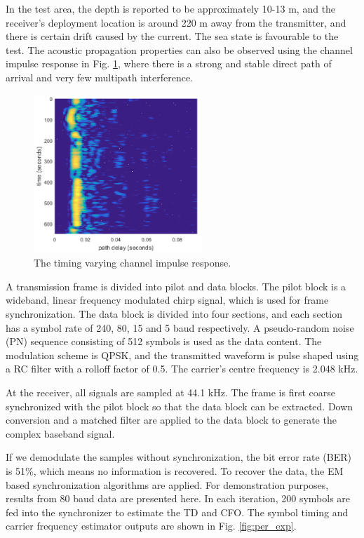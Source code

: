 \documentclass[journal,comsoc]{IEEEtran}
\begin{document}
In the test area, the depth is reported to be approximately 10-13 m, and the receiver's deployment location is around 220 m away from the transmitter, and there is certain drift caused by the current.
The sea state is favourable to the test. 
The acoustic propagation properties can also be observed using the channel impulse response in Fig. \ref{fig:chan_impu}, where there is a strong and stable direct path of arrival and very few multipath interference.
\begin{figure}[htbp]
\centering
\includegraphics[width=2.5in]{pic/channel.png}
\caption{The timing varying channel impulse response.}
\label{fig:chan_impu} 
\end{figure}

A transmission frame is divided into pilot and data blocks. The pilot block is a wideband, linear frequency modulated chirp signal, which is used for frame synchronization.
The data block is divided into four sections, and each section has a symbol rate of 240, 80, 15 and 5 baud respectively. 
A pseudo-random noise (PN) sequence consisting of 512 symbols is used as the data content.
The modulation scheme is QPSK, and the transmitted waveform is pulse shaped using a RC filter with a rolloff factor of 0.5. 
The carrier's centre frequency is 2.048 kHz. 

At the receiver, all signals are sampled at 44.1 kHz. The frame is first coarse synchronized with the pilot block so that the data block can be extracted.
Down conversion and a matched filter are applied to the data block to generate the complex baseband signal.

If we demodulate the samples without synchronization, the bit error rate (BER) is 51\%, which means no information is recovered.
To recover the data, the EM based synchronization algorithms are applied.
For demonstration purposes, results from 80 baud data are presented here.
In each iteration, 200 symbols are fed into the synchronizer to estimate the TD and CFO. 
The symbol timing and carrier frequency estimator outputs are shown in Fig. \ref{fig:per_exp}.
\end{document}
